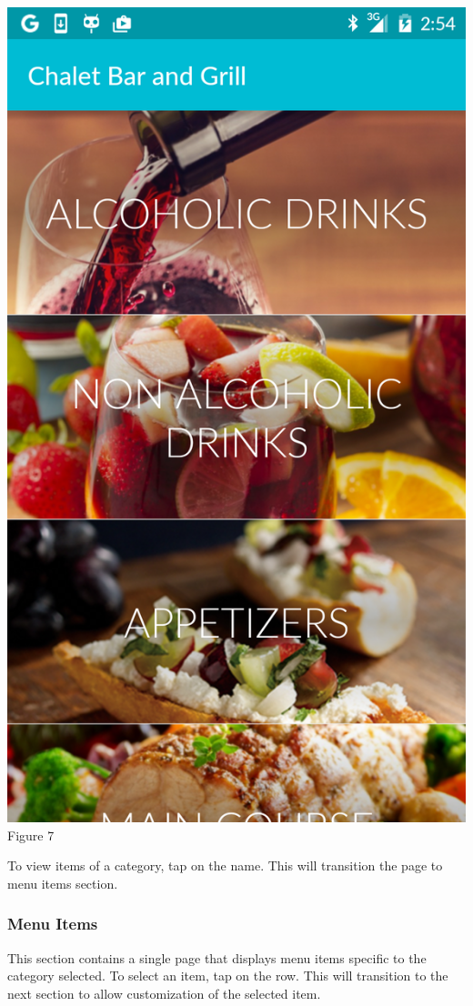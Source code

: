 \documentclass[12pt, titlepage]{article}
\begin{document}
\begin{center}\includegraphics[scale=0.15]{main-menu.png}	\linebreak Figure 7\end{center}

\noindent To view items of a category, tap on the name. This will transition the page to menu items section.

\subsubsection{Menu Items}
This section contains a single page that displays menu items specific to the category selected. To select an item, tap on the row. This will transition to the next section to allow customization of the selected item. 
\end{document}
